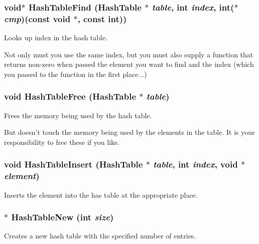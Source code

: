 \subsubsection{\setlength{\rightskip}{0pt plus 5cm}void$\ast$ Hash\-Table\-Find ({\bf Hash\-Table} $\ast$ {\em table}, int {\em index}, int($\ast$ {\em cmp})(const void $\ast$, const int))}\label{HashTable_8h_a3}


Looks up index in the hash table. 

Not only must you use the same index, but you must also supply a function that returns non-zero when passed the element you want to find and the index (which you passed to the function in the first place...) 
\subsubsection{\setlength{\rightskip}{0pt plus 5cm}void Hash\-Table\-Free ({\bf Hash\-Table} $\ast$ {\em table})}\label{HashTable_8h_a4}


Frees the memory being used by the hash table. 

But doesn't touch the memory being used by the elements in the table. It is your responsibility to free these if you like. 
\subsubsection{\setlength{\rightskip}{0pt plus 5cm}void Hash\-Table\-Insert ({\bf Hash\-Table} $\ast$ {\em table}, int {\em index}, void $\ast$ {\em element})}\label{HashTable_8h_a2}


Inserts the element into the has table at the appropriate place. 

\subsubsection{$\ast$ Hash\-Table\-New (int {\em size})}\label{HashTable_8h_a1}


Creates a new hash table with the specified number of entries. 

